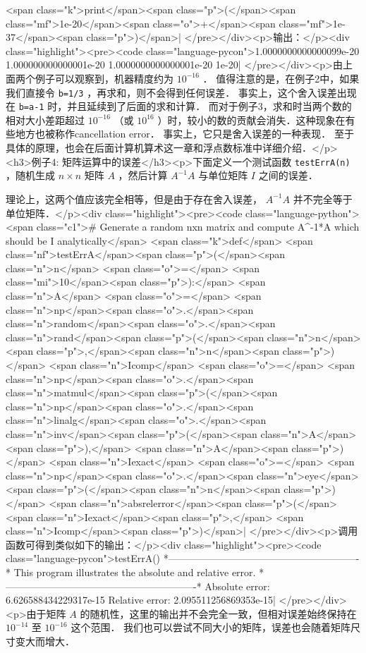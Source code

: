 <span class="k">print</span><span class="p">(</span><span class="mf">1e-20</span><span class="o">+</span><span class="mf">1e-37</span><span class="p">)</span>| </pre></div><p>输出：</p><div class="highlight"><pre><code class="language-pycon">1.0000000000000099e-20
1.000000000000001e-20
1.0000000000000001e-20
1e-20| </pre></div><p>由上面两个例子可以观察到，机器精度约为  $10^{-16}$  ． 值得注意的是，在例子2中，如果我们直接令 \verb|b=1/3| ，再求和，则不会得到任何误差． 事实上，这个舍入误差出现在 \verb|b=a-1| 时，并且延续到了后面的求和计算． 而对于例子3，求和时当两个数的相对大小差距超过  $10^{-16}$  （或  $10^{16}$  ）时，较小的数的贡献会消失．这种现象在有些地方也被称作cancellation error． 事实上，它只是舍入误差的一种表现． 至于具体的原理，也会在后面计算机算术这一章和浮点数标准中详细介绍．</p><h3>例子4: 矩阵运算中的误差</h3><p>下面定义一个测试函数 \verb|testErrA(n)| ，随机生成  $n\times n$  矩阵  $A$  ，然后计算  $A^{-1}A$  与单位矩阵  $I$  之间的误差．

理论上，这两个值应该完全相等，但是由于存在舍入误差， $A^{-1}A$ 并不完全等于单位矩阵．</p><div class="highlight"><pre><code class="language-python"><span class="c1"># Generate a random nxn matrix and compute A^{-1}*A which should be I analytically</span>
<span class="k">def</span> <span class="nf">testErrA</span><span class="p">(</span><span class="n">n</span> <span class="o">=</span> <span class="mi">10</span><span class="p">):</span>
    <span class="n">A</span> <span class="o">=</span> <span class="n">np</span><span class="o">.</span><span class="n">random</span><span class="o">.</span><span class="n">rand</span><span class="p">(</span><span class="n">n</span><span class="p">,</span><span class="n">n</span><span class="p">)</span>
    <span class="n">Icomp</span> <span class="o">=</span> <span class="n">np</span><span class="o">.</span><span class="n">matmul</span><span class="p">(</span><span class="n">np</span><span class="o">.</span><span class="n">linalg</span><span class="o">.</span><span class="n">inv</span><span class="p">(</span><span class="n">A</span><span class="p">),</span> <span class="n">A</span><span class="p">)</span>
    <span class="n">Iexact</span> <span class="o">=</span> <span class="n">np</span><span class="o">.</span><span class="n">eye</span><span class="p">(</span><span class="n">n</span><span class="p">)</span>
    <span class="n">absrelerror</span><span class="p">(</span><span class="n">Iexact</span><span class="p">,</span> <span class="n">Icomp</span><span class="p">)</span>| </pre></div><p>调用函数可得到类似如下的输出：</p><div class="highlight"><pre><code class="language-pycon">testErrA()
*----------------------------------------------------------*
This program illustrates the absolute and relative error.
*----------------------------------------------------------*
Absolute error: 6.626588434229317e-15
Relative error: 2.095511256869353e-15| </pre></div><p>由于矩阵  $A$  的随机性，这里的输出并不会完全一致，但相对误差始终保持在 $10^{-14}$  至  $10^{-16}$  这个范围． 我们也可以尝试不同大小的矩阵，误差也会随着矩阵尺寸变大而增大．

